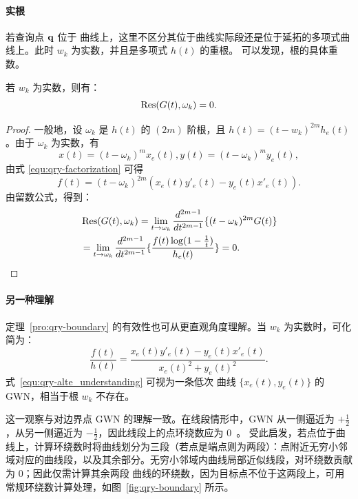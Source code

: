 \paragraph{实根}
若查询点 $\mathbf{q}$ 位于 \Bezier 曲线上，这里不区分其位于曲线实际段还是位于延拓的多项式曲线上。此时 \(w_k\) 为实数，并且是多项式 \(h(t)\) 的重根。
可以发现，根的具体重数。
\begin{theorem}\label{pro:qry-boundary}
若 \(w_k\) 为实数，则有：
\[\mathop{\mathrm{Res}}(G(t),\omega_k)=0.\]
\end{theorem}
\begin{proof}
一般地，设 \(\omega_k\) 是 \(h(t)\) 的 \((2m)\) 阶根，且 $h(t)=(t-w_k)^{2m}h_e(t)$。由于 \(\omega_k\) 为实数，有
\begin{equation}\label{equ:qry-factorization}
    x(t)=(t-\omega_k)^m x_e(t),y(t)=(t-\omega_k)^m y_e(t),
\end{equation}
由式 \eqref{equ:qry-factorization} 可得
 \begin{equation}
      f(t) = (t-\omega_k)^{2m} (x_e(t)y'_e(t)-y_e(t) x'_e(t)).
 \end{equation}
 由留数公式，得到：
\begin{equation}
\begin{aligned}
    &\mathop{\mathrm{Res}}(G(t),\omega_k)=\lim_{t\to \omega_k}\frac{d^{2m-1}}{dt^{2m-1}}\{(t-\omega_k)^{2m} G(t)\} \\
    &=\lim_{t\to \omega_k}\frac{d^{2m-1}}{dt^{2m-1}}\{\frac{f(t)\log(1-\frac{1}{t})}{h_e(t)}\} =0.
 \end{aligned}
\end{equation}
\end{proof}


\paragraph{另一种理解}
定理~\ref{pro:qry-boundary} 的有效性也可从更直观角度理解。当 \(w_k\) 为实数时，可化简为：
\begin{equation}\label{equ:qry-alte_understanding}
    \frac{f(t)}{h(t)}=\frac{x_e(t)y'_e(t)-y_e(t)x'_e(t)}{x_e(t)^2+y_e(t)^2}.
\end{equation}
式~\eqref{equ:qry-alte_understanding} 可视为一条低次 \Bezier 曲线 $\{x_e(t),y_e(t)\}$ 的 GWN，相当于根 \(w_k\) 不存在。

这一观察与对边界点 GWN 的理解一致。在线段情形中，GWN 从一侧逼近为 \(+\tfrac{1}{2}\)，从另一侧逼近为 \(-\tfrac{1}{2}\)，因此线段上的点环绕数应为 0~\cite{Jacobson2013RobustIS}。
受此启发，若点位于曲线上，计算环绕数时将曲线划分为三段（若点是端点则为两段）：点附近无穷小邻域对应的曲线段，以及其余部分。无穷小邻域内曲线局部近似线段，对环绕数贡献为 0；因此仅需计算其余两段 \Bezier 曲线的环绕数，因为目标点不位于这两段上，可用常规环绕数计算处理，如图~\ref{fig:qry-boundary} 所示。

